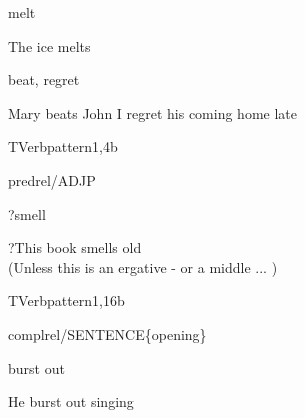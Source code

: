 \begin{thetadescr}
\evitem  melt
\esitem
     \begin{examples}
        \example The ice melts
     \end{examples}
\end{thetadescr}



\begin{thetadescr}
\evitem beat, regret
\esitem
     \begin{examples}
        \example Mary beats John
        \example I regret his coming home late
     \end{examples}
\end{thetadescr}


\newpage
\verbpattern{[synOPENADJPPROP] }
\begin{vpattern}
 TVerbpattern1,4b
\csritem \mbox{}\\
     \begin{csr}
     predrel/ADJP
     \end{csr}
\remarksitem
\end{vpattern}


\begin{thetadescr}
\evitem ?smell
\esitem
     \begin{examples}
        \example ?This book smells old\\
                 (Unless this is an ergative - or a middle ... )
     \end{examples}
\end{thetadescr}


\newpage
\verbpattern{[synOPENGERUND]}
\begin{vpattern}
 TVerbpattern1,16b
\csritem \mbox{}\\
     \begin{csr}
     complrel/SENTENCE\{opening\}
     \end{csr}
\remarksitem
\end{vpattern}


\begin{thetadescr}
\evitem burst out
\esitem
     \begin{examples}
        \example He burst out singing
     \end{examples}
\end{thetadescr}


